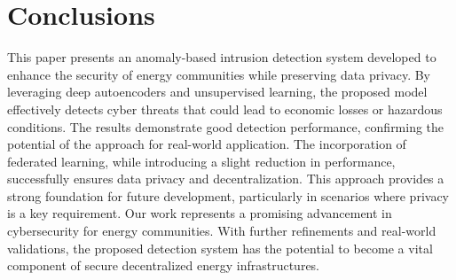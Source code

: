 \section{Conclusions}

This paper presents an anomaly-based intrusion detection system developed to enhance the security of energy communities while preserving data privacy. By leveraging deep autoencoders and unsupervised learning, the proposed model effectively detects cyber threats that could lead to economic losses or hazardous conditions. The results demonstrate good detection performance, confirming the potential of the approach for real-world application. The incorporation of federated learning, while introducing a slight reduction in performance, successfully ensures data privacy and decentralization. This approach provides a strong foundation for future development, particularly in scenarios where privacy is a key requirement. Our work represents a promising advancement in cybersecurity for energy communities. With further refinements and real-world validations, the proposed detection system has the potential to become a vital component of secure decentralized energy infrastructures. 

